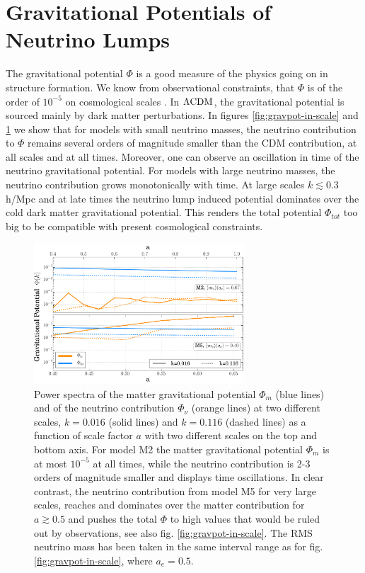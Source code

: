 \section{Gravitational Potentials of Neutrino Lumps}

The gravitational potential $\Phi$ is a good measure of the physics
going on in structure formation. We know from observational constraints,
that $\Phi$ is of the order of $10^{-5}$ on cosmological scales
\cite{pettorino_neutrino_2010,brouzakis_nonlinear_2011}. In $\Lambda\mathrm{CDM}$,
the gravitational potential is sourced mainly by dark matter perturbations.
In figures \ref{fig:gravpot-in-scale} and \ref{fig:gravpot-intime1}
we show that for models with small neutrino masses, the neutrino contribution
to $\Phi$ remains several orders of magnitude smaller than the CDM
contribution, at all scales and at all times. Moreover, one can observe
an oscillation in time of the neutrino gravitational potential. For
models with large neutrino masses, the neutrino contribution grows
monotonically with time. At large scales $k\lesssim0.3$h/Mpc and
at late times the neutrino lump induced potential dominates over the
cold dark matter gravitational potential. This renders the total potential
$\Phi_{tot}$ too big to be compatible with present cosmological constraints.
\begin{figure}
\centering{}\includegraphics[width=0.7\textwidth]{Chapters/gnq/figures/Phi-GravPotSpec-InTime-M2-and-M5-2scales-Phinu_Phim-new}
\caption[Power spectra of the matter gravitational
potential $\Phi_{m}$ and of the neutrino contribution
$\Phi_{\nu}$ for GNQ.]{\label{fig:gravpot-intime1} Power spectra of the matter gravitational
potential $\Phi_{m}$ (blue lines) and of the neutrino contribution
$\Phi_{\nu}$ (orange lines) at two different scales, $k=0.016$ (solid
lines) and $k=0.116$ (dashed lines) as a function of scale factor
$a$ with two different scales on the top and bottom axis. For model
M2 the matter gravitational potential $\Phi_{m}$ is at most $10^{-5}$
at all times, while the neutrino contribution is 2-3 orders of magnitude
smaller and displays time oscillations. In clear contrast, the neutrino
contribution from model M5 for very large scales, reaches and dominates
over the matter contribution for $a\gtrsim0.5$ and pushes the total
$\Phi$ to high values that would be ruled out by observations, see
also fig. \ref{fig:gravpot-in-scale}. The RMS neutrino mass has been
taken in the same interval range as for fig.\ref{fig:gravpot-in-scale},
where $a_{e}=0.5$.}
\end{figure}


